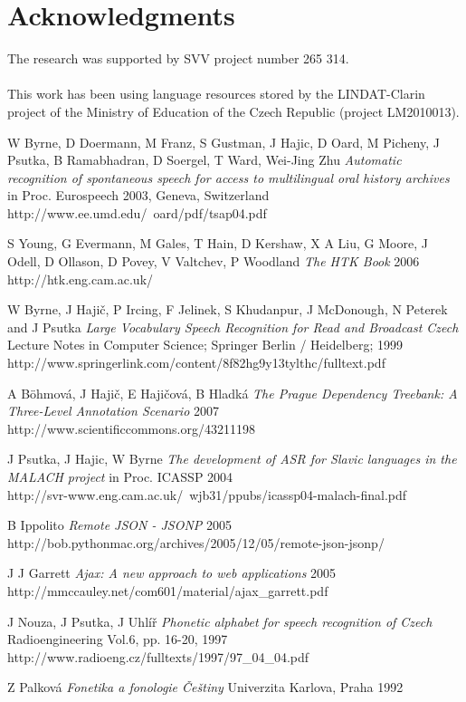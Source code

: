 \documentclass{llncs}
\begin{document}
\section*{Acknowledgments}

The research was supported by SVV project number 265 314.\\
\\
This work has been using language resources stored
by the LINDAT-Clarin project of the Ministry of
Education of the Czech Republic (project LM2010013).



\begin{thebibliography}{}

W Byrne, D Doermann, M Franz, S Gustman, J Hajic, D Oard, M Picheny, J Psutka, B
Ramabhadran, D Soergel, T Ward, Wei-Jing Zhu
\emph{Automatic recognition of spontaneous speech for access to multilingual
oral history archives}
in Proc. Eurospeech 2003, Geneva, Switzerland
http://www.ee.umd.edu/~oard/pdf/tsap04.pdf

S Young, G Evermann, M Gales, T Hain, D Kershaw, X A Liu, G Moore, J Odell, D
Ollason, D Povey, V Valtchev, P Woodland
\emph{The HTK Book}
2006\\
http://htk.eng.cam.ac.uk/

W Byrne, J Hajič, P Ircing, F Jelinek, S Khudanpur, J McDonough, N Peterek
and J Psutka
\emph{Large Vocabulary Speech Recognition for Read and Broadcast Czech}
Lecture Notes in Computer Science; Springer Berlin / Heidelberg; 1999\\
http://www.springerlink.com/content/8f82hg9y13tylthc/fulltext.pdf

A B\"{o}hmová, J Haji\v{c}, E Haji\v{c}ová, B Hladká
\emph{The Prague Dependency Treebank: A Three-Level Annotation Scenario}
2007\\
http://www.scientificcommons.org/43211198

J Psutka, J Hajic, W Byrne
\emph{The development of ASR for Slavic languages in the MALACH project}
in Proc. ICASSP 2004\\
http://svr-www.eng.cam.ac.uk/~wjb31/ppubs/icassp04-malach-final.pdf

B Ippolito
\emph{Remote JSON - JSONP}
2005\\
http://bob.pythonmac.org/archives/2005/12/05/remote-json-jsonp/

J J Garrett
\emph{Ajax: A new approach to web applications}
2005\\
http://mmccauley.net/com601/material/ajax\_garrett.pdf

J Nouza, J Psutka, J Uhlíř
\emph{Phonetic alphabet for speech recognition of Czech}
Radioengineering Vol.6, pp. 16-20, 1997\\
http://www.radioeng.cz/fulltexts/1997/97\_04\_04.pdf

Z Palková
\emph{Fonetika a fonologie Češtiny}
Univerzita Karlova, Praha 1992

\end{thebibliography}
%
\end{document}
